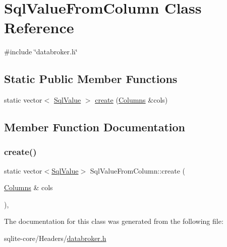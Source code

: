 \hypertarget{classSqlValueFromColumn}{}\section{Sql\+Value\+From\+Column Class Reference}
\label{classSqlValueFromColumn}


{\ttfamily \#include \char`\"{}databroker.\+h\char`\"{}}

\subsection*{Static Public Member Functions}
\begin{DoxyCompactItemize}
\item 
static vector$<$ \mbox{\hyperlink{structSqlValue}{Sql\+Value}} $>$ \mbox{\hyperlink{classSqlValueFromColumn_a6e5d90bf8021211958258d2ea5e9c3a2}{create}} (\mbox{\hyperlink{classColumns}{Columns}} \&cols)
\end{DoxyCompactItemize}


\subsection{Member Function Documentation}
\mbox{\label{classSqlValueFromColumn_a6e5d90bf8021211958258d2ea5e9c3a2}} 
\subsubsection{\texorpdfstring{create()}{create()}}
{\footnotesize\ttfamily static vector$<$\mbox{\hyperlink{structSqlValue}{Sql\+Value}}$>$ Sql\+Value\+From\+Column\+::create (\begin{DoxyParamCaption}\item[{\mbox{\hyperlink{classColumns}{Columns}} \&}]{cols }\end{DoxyParamCaption})\hspace{0.3cm}{\ttfamily [inline]}, {\ttfamily [static]}}



The documentation for this class was generated from the following file\+:\begin{DoxyCompactItemize}
\item 
sqlite-\/core/\+Headers/\mbox{\hyperlink{databroker_8h}{databroker.\+h}}\end{DoxyCompactItemize}
